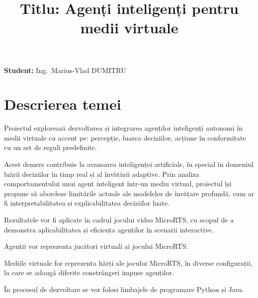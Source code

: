 \documentclass[12pt,a4paper]{article}
\title{\textbf{Titlu: Agenți inteligenți pentru medii virtuale} }
\begin{document}
\maketitle

\textbf{Student:} Ing.\ Marius-Vlad DUMITRU

\section{\textbf{Descrierea temei} }

    Proiectul explorează dezvoltarea și integrarea agenților inteligenți autonomi în medii virtuale cu accent pe: percepție, luarea deciziilor, acțiune în conformitate cu un set de reguli predefinite.

    Acest demers contribuie la avansarea inteligenței artificiale, în special în domeniul luării deciziilor în timp real și al învățării adaptive. Prin analiza comportamentului unui agent inteligent într-un mediu virtual, proiectul își propune să abordeze limitările actuale ale modelelor de învățare profundă, cum ar fi interpretabilitatea și explicabilitatea deciziilor luate.

    Rezultatele vor fi aplicate în cadrul jocului video MicroRTS, cu scopul de a demonstra aplicabilitatea și eficiența agenților în scenarii interactive.

    Agenții vor reprezenta jucători virtuali ai jocului MicroRTS.

    Mediile virtuale for reprezenta hărți ale jocului MicroRTS, în diverse configurații, la care se adaugă diferite constrângeri impuse agenților.

    În procesul de dezvoltare se vor folosi limbajele de programare Python și Java.

    \pagebreak
\end{document}
